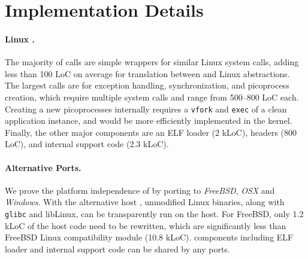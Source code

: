 \section{Implementation Details}
\label{sec:graphene:impl}

\paragraph{Linux \pal{}.}
The majority of \pal{} calls are simple wrappers for similar Linux system calls, 
adding less than 100 LoC on average for translation between \pal{} and Linux abstractions.
The largest \pal{} calls are for exception handling, synchronization, and picoprocess
creation, which require multiple system calls and range from 500--800 LoC each.
Creating a new picoprocesses internally requires a {\tt vfork} and {\tt exec} of a clean 
application instance, and would be more efficiently implemented in the kernel.
Finally, the other major \pal{} components are an ELF loader (2 kLoC), headers (800 LoC),
and internal support code (2.3 kLoC).

\paragraph{Alternative \pal{} Ports.}
We prove the platform independence of \sysname{}
by porting \pal{} to {\em FreeBSD}, {\em OSX} and {\em Windows}.
With the alternative host \pal{}, unmodified Linux binaries,
along with {\tt glibc} and {libLinux},
can be transparently run on the host.
For FreeBSD,
only 1.2 kLoC of the host \pal{} code need to be rewritten,
which are significantly less than FreeBSD Linux compatibility module (10.8 kLoC).
\pal{} components including ELF loader and internal support code can be shared by any \pal{} ports.



